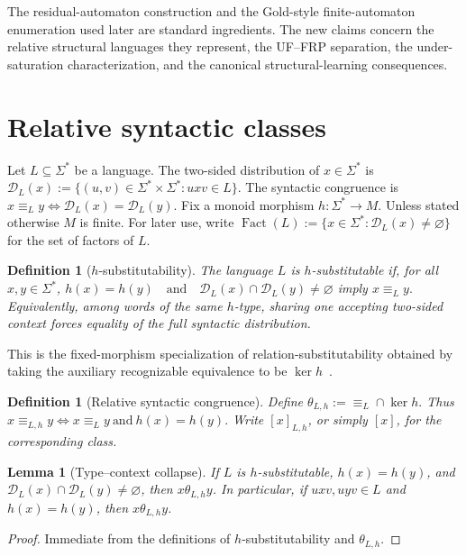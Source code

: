 \documentclass[11pt,a4paper]{article}
\newtheorem{lemma}[theorem]{Lemma}
\newtheorem{definition}[theorem]{Definition}
\newcommand{\D}{\mathcal D}
\newcommand{\Fact}{\operatorname{Fact}}
\begin{document}
The residual-automaton construction and the Gold-style finite-automaton enumeration used later are standard ingredients.  The new claims concern the relative structural languages they represent, the UF--FRP separation, the under-saturation characterization, and the canonical structural-learning consequences.

\section{Relative syntactic classes}
\label{sec:relative}

Let $L\subseteq\Sigma^*$ be a language.  The two-sided distribution of $x\in\Sigma^*$ is
\(\D_L(x):=\{(u,v)\in\Sigma^*\times\Sigma^*:uxv\in L\}.\)
The syntactic congruence is
\(x\equiv_L y \iff \D_L(x)=\D_L(y).\)
Fix a monoid morphism $h:\Sigma^*\to M$.  Unless stated otherwise $M$ is finite.  For later use, write
\(\Fact(L):=\{x\in\Sigma^*:\D_L(x)\neq\varnothing\}\)
for the set of factors of $L$.

\begin{definition}[$h$-substitutability]
The language $L$ is \emph{$h$-substitutable} if, for all $x,y\in\Sigma^*$,
\(h(x)=h(y) \quad\text{and}\quad \D_L(x)\cap\D_L(y)\neq\varnothing\)
imply
\(x\equiv_L y.\)
Equivalently, among words of the same $h$-type, sharing one accepting two-sided context forces equality of the full syntactic distribution.
\end{definition}

This is the fixed-morphism specialization of relation-substitutability obtained by taking the auxiliary recognizable equivalence to be $\ker h$~\cite{KuriyamaFixedH}.

\begin{definition}[Relative syntactic congruence]
Define
\(\theta_{L,h}:=\equiv_L\cap\ker h.\)
Thus
\(x\equiv_{L,h}y \iff x\equiv_L y\ \text{and}\ h(x)=h(y).\)
Write $[x]_{L,h}$, or simply $[x]$, for the corresponding class.
\end{definition}

\begin{lemma}[Type--context collapse]
\label{lem:type-context-collapse}
If $L$ is $h$-substitutable, $h(x)=h(y)$, and
$\D_L(x)\cap\D_L(y)\ne\varnothing$, then $x\theta_{L,h}y$.
In particular, if $uxv,uyv\in L$ and $h(x)=h(y)$, then
$x\theta_{L,h}y$.
\end{lemma}

\begin{proof}
Immediate from the definitions of $h$-substitutability and $\theta_{L,h}$.
\end{proof}
\end{document}
